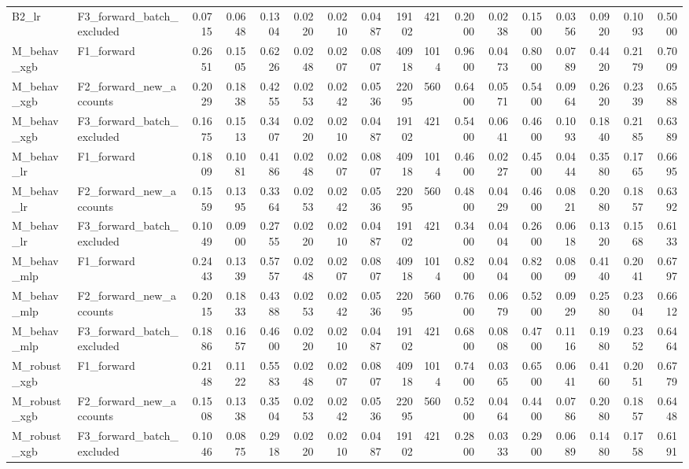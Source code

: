 \begin{table}
\begin{tabular}{llrrrrrrrrrrrrrrr}
B2\_lr & F3\_forward\_batch\_excluded & 0.0715 & 0.0648 & 0.1304 & 0.0220 & 0.0210 & 0.0487 & 19102 & 421 & 0.2000 & 0.0238 & 0.1500 & 0.0356 & 0.0920 & 0.1093 & 0.5000 \\
M\_behav\_xgb & F1\_forward & 0.2651 & 0.1505 & 0.6226 & 0.0248 & 0.0207 & 0.0807 & 40918 & 1014 & 0.9600 & 0.0473 & 0.8000 & 0.0789 & 0.4420 & 0.2179 & 0.7009 \\
M\_behav\_xgb & F2\_forward\_new\_accounts & 0.2029 & 0.1838 & 0.4255 & 0.0253 & 0.0242 & 0.0536 & 22095 & 560 & 0.6400 & 0.0571 & 0.5400 & 0.0964 & 0.2620 & 0.2339 & 0.6588 \\
M\_behav\_xgb & F3\_forward\_batch\_excluded & 0.1675 & 0.1513 & 0.3407 & 0.0220 & 0.0210 & 0.0487 & 19102 & 421 & 0.5400 & 0.0641 & 0.4600 & 0.1093 & 0.1840 & 0.2185 & 0.6389 \\
M\_behav\_lr & F1\_forward & 0.1809 & 0.1081 & 0.4186 & 0.0248 & 0.0207 & 0.0807 & 40918 & 1014 & 0.4600 & 0.0227 & 0.4500 & 0.0444 & 0.3580 & 0.1765 & 0.6695 \\
M\_behav\_lr & F2\_forward\_new\_accounts & 0.1559 & 0.1395 & 0.3364 & 0.0253 & 0.0242 & 0.0536 & 22095 & 560 & 0.4800 & 0.0429 & 0.4600 & 0.0821 & 0.2080 & 0.1857 & 0.6392 \\
M\_behav\_lr & F3\_forward\_batch\_excluded & 0.1049 & 0.0900 & 0.2755 & 0.0220 & 0.0210 & 0.0487 & 19102 & 421 & 0.3400 & 0.0404 & 0.2600 & 0.0618 & 0.1320 & 0.1568 & 0.6133 \\
M\_behav\_mlp & F1\_forward & 0.2443 & 0.1339 & 0.5757 & 0.0248 & 0.0207 & 0.0807 & 40918 & 1014 & 0.8200 & 0.0404 & 0.8200 & 0.0809 & 0.4140 & 0.2041 & 0.6797 \\
M\_behav\_mlp & F2\_forward\_new\_accounts & 0.2015 & 0.1833 & 0.4388 & 0.0253 & 0.0242 & 0.0536 & 22095 & 560 & 0.7600 & 0.0679 & 0.5200 & 0.0929 & 0.2580 & 0.2304 & 0.6612 \\
M\_behav\_mlp & F3\_forward\_batch\_excluded & 0.1886 & 0.1657 & 0.4600 & 0.0220 & 0.0210 & 0.0487 & 19102 & 421 & 0.6800 & 0.0808 & 0.4700 & 0.1116 & 0.1980 & 0.2352 & 0.6464 \\
M\_robust\_xgb & F1\_forward & 0.2148 & 0.1122 & 0.5583 & 0.0248 & 0.0207 & 0.0807 & 40918 & 1014 & 0.7400 & 0.0365 & 0.6500 & 0.0641 & 0.4160 & 0.2051 & 0.6779 \\
M\_robust\_xgb & F2\_forward\_new\_accounts & 0.1508 & 0.1338 & 0.3504 & 0.0253 & 0.0242 & 0.0536 & 22095 & 560 & 0.5200 & 0.0464 & 0.4400 & 0.0786 & 0.2080 & 0.1857 & 0.6448 \\
M\_robust\_xgb & F3\_forward\_batch\_excluded & 0.1046 & 0.0875 & 0.2918 & 0.0220 & 0.0210 & 0.0487 & 19102 & 421 & 0.2800 & 0.0333 & 0.2900 & 0.0689 & 0.1480 & 0.1758 & 0.6191 \\

\end{tabular}
\end{table}
